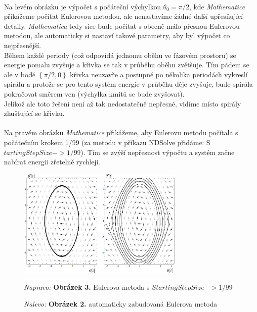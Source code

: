 \documentclass[reqno, a4paper]{amsart}
\begin{document}
				\\
				Na levém obrázku je výpočet s počáteční výchylkou $\theta_{0}=\pi/2$, kde \textit{Mathematice} přikážeme počítat Eulerovou metodou, ale nenastavíme žádné další upřesňující detaily. \textit{Mathematica} tedy sice bude počítat s obecně málo přesnou Eulerovou metodou, ale automaticky si nastaví takové parametry, aby byl výpočet co nejpřesnější.
				\\
				Během každé periody (což odpovídá jednomu oběhu ve fázovém prostoru) se energie pomalu zvyšuje a křivka se tak v průběhu oběhu zvětšuje. Tím pádem se ale v bodě $\left\lbrace \pi/2,0\right\rbrace $ křivka neuzavře a postupně po několika periodách vykreslí spirálu a protože se pro tento systém energie v průběhu děje zvyšuje, bude spirála pokračovat směrem ven (výchylka kmitů se bude zvyšovat). 
				\\
				Jelikož ale toto řešení není až tak nedostatečně nepřesné, vidíme místo spirály zhušťující se křivku.
				\\
				\\
				Na pravém obrázku \textit{Mathematice} přikážeme, aby Eulerovu metodu počítala s počátečním krokem 1/99 (za metodu v příkazu NDSolve přidáme: S$ tartingStepSize -> 1/99 $). Tím se zvýší nepřesnost výpočtu a systém začne nabírat energii zřetelně rychleji.
				\begin{figure}[h]
					\centering
					\includegraphics[width=0.72\textwidth]{pole2}
					\caption*{\textit{Nalevo:} \textbf{Obrázek 2.} automaticky zabudovaná Eulerova metoda}  \textit{Napravo:} \textbf{Obrázek 3.} Eulerova metoda s $StartingStepSize -> 1/99$  
				\end{figure}
				\clearpage
\end{document}
